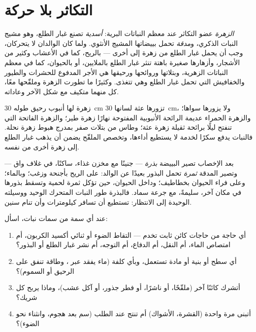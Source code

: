 \section{التكاثر بلا حركة}

\begin{proposition}\label{prop:g12:plant-rooted-life:flowers}
\emph{الزهرة} عضو التكاثر عند معظم النباتات البرية: \emph{أسدية} تصنع
غبار الطلع، وهو مشيج النبات الذكري، و\emph{مدقة} تحمل بييضاتها المشيج
الأنثوي. ولما كان الوالدان لا يتحركان، وجب أن يحمل غبار الطلع من زهرة إلى
أخرى --- بالريح، كما في الأعشاب وكثير من الأشجار، وأزهارها صغيرة باهتة
تنثر غبار الطلع بالملايين، أو بالحيوان، كما في معظم النباتات الزهرية،
وبتلاتها وروائحها ورحيقها هي الأجر المدفوع للحشرات والطيور والخفافيش
التي تحمل غبار الطلع وهي تتغذى. وكثيرًا ما تطورت الزهرة وملقّحها معًا، كل
منهما متكيف مع شكل الآخر وعاداته.
\end{proposition}
\admitted

\begin{example}\label{ex:g12:plant-rooted-life:match}
زهرة لها أنبوب رحيق طوله \qty{30}{cm} تزورها عثة لسانها
\qty{30}{cm}، ولا يزورها سواها؛ والزهرة الحمراء عديمة الرائحة
الأنبوبية المفتوحة نهارًا زهرة طير؛ والزهرة الفاتحة التي تنفتح ليلًا
برائحة ثقيلة زهرة عثة؛ وطاس من بتلات صفر بمدرج هبوط زهرة نحلة. فالنبات
يدفع سكرًا لخدمة لا يستطيع أداءها، وتخصص الملقّح يضمن أن يذهب غبار الطلع
إلى زهرة أخرى من  نفسه.
\end{example}

\begin{proposition}\label{prop:g12:plant-rooted-life:dispersal}
بعد الإخصاب تصير البييضة \emph{بذرة} --- جنينًا مع مخزن غذاء، ساكنًا،
في غلاف واق --- وتصير المدقة \emph{ثمرة} تحمل البذور بعيدًا عن الوالد:
على الريح بأجنحة وزغب؛ وبالماء؛ وعلى فراء الحيوان بخطاطيف؛ وداخل
الحيوان، حين تؤكل ثمرة لحمية وتسقط بذورها في مكان آخر، سليمةً، مع جرعة
سماد. فالبذرة طور النبات المتحرك الوحيد ووسيلته الوحيدة إلى الانتظار:
تستطيع أن تسافر كيلومترات وأن تنام سنين.
\end{proposition}
\admitted

\begin{method}\label{met:g12:plant-rooted-life:read}
عند أي سمة من سمات نبات، اسأل:
\begin{enumerate}
  \item أي حاجة من حاجات كائن ثابت تخدم --- التقاط الضوء أو ثنائي
        أكسيد الكربون، أم امتصاص الماء، أم النقل، أم الدفاع، أم
        التوجه، أم نشر غبار الطلع أو البذور؟
  \item أي سطح أو بنية أو مادة تستعمل، وبأي كلفة (ماء يفقد عبر
        ، وطاقة تنفق على الرحيق أو السموم)؟
  \item أتشرك كائنًا آخر (ملقّحًا، أو ناشرًا، أو فطر جذور، أو آكل عشب)،
        وماذا يربح كل شريك؟
  \item أتبنى مرة واحدة (القشرة، الأشواك) أم تنتج عند الطلب (سم بعد
        هجوم، وانثناء نحو الضوء)؟
\end{enumerate}
\end{method}

